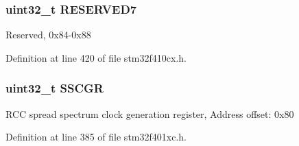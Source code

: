 \subsubsection[{\texorpdfstring{R\+E\+S\+E\+R\+V\+E\+D7}{RESERVED7}}]{\setlength{\rightskip}{0pt plus 5cm}uint32\+\_\+t R\+E\+S\+E\+R\+V\+E\+D7}\hypertarget{struct_r_c_c___type_def_a3996b25fd21e35d51d83becbe6c79524}{}\label{struct_r_c_c___type_def_a3996b25fd21e35d51d83becbe6c79524}
Reserved, 0x84-\/0x88 

Definition at line 420 of file stm32f410cx.\+h.

\subsubsection[{\texorpdfstring{S\+S\+C\+GR}{SSCGR}}]{ uint32\+\_\+t S\+S\+C\+GR}\hypertarget{struct_r_c_c___type_def_aaef3da59eaf7c6dfdf9a12fd60ce58a8}{}\label{struct_r_c_c___type_def_aaef3da59eaf7c6dfdf9a12fd60ce58a8}
R\+CC spread spectrum clock generation register, Address offset\+: 0x80 

Definition at line 385 of file stm32f401xc.\+h.



